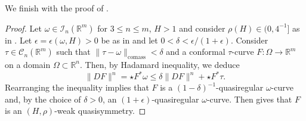 \documentclass[a4paper,leqno,11pt]{amsart}
\numberwithin{equation}{section}
\theoremstyle{remark}
\theoremstyle{remark}
\newcommand{\R}{\mathbb{R}}
\newcommand{\comass}{\mathrm{comass}}
\begin{document}


We finish with the proof of .

\weakQS*

\begin{proof}
Let $\omega \in \mathcal{I}_n( \R^m )$ for $3 \leq n \leq m$, $H > 1$ and consider $\rho(H) \in (0, 4^{-1}]$ as in . Let $\epsilon = \epsilon( \omega, H ) > 0$ be as in  and let $0 < \delta < \epsilon/(1+\epsilon)$. Consider $\tau \in \mathcal{C}_n( \R^m )$ such that $\| \tau - \omega \|_{ \comass } < \delta$ and a conformal $\tau$-curve $F \colon \Omega \to \R^m$ on a domain $\Omega \subset \R^n$. Then, by Hadamard inequality, we deduce
\begin{equation*}
    \|DF\|^n = \star F^{*}\omega \leq \delta\|DF\|^n + \star F^{*}\tau.
\end{equation*}
Rearranging the inequality implies that $F$ is a $(1-\delta)^{-1}$-quasiregular $\omega$-curve and, by the choice of $\delta > 0$, an $(1+\epsilon)$-quasiregular $\omega$-curve. Then  gives that $F$ is an $( H, \rho )$-weak quasisymmetry.
\end{proof}
\end{document}
